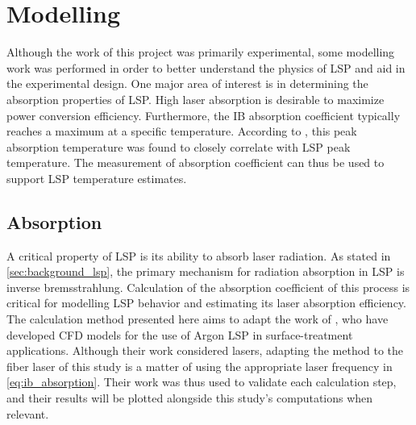 \chapter{Modelling} \label{chp:models}
    Although the work of this project was primarily experimental, some modelling work was performed in order to better understand the physics of LSP and aid in the experimental design. One major area of interest is in determining the absorption properties of LSP. High laser absorption is desirable to maximize power conversion efficiency. Furthermore, the IB absorption coefficient typically reaches a maximum at a specific temperature. According to \textcite{keeferLaserSustainedPlasmas1989}, this peak absorption temperature was found to closely correlate with LSP peak temperature. The measurement of absorption coefficient can thus be used to support LSP temperature estimates.

    \section{Absorption} \label{sec:models_absorption}
        A critical property of LSP is its ability to absorb laser radiation. As stated in \autoref{sec:background_lsp}, the primary mechanism for radiation absorption in LSP is inverse bremsstrahlung. Calculation of the absorption coefficient of this process is critical for modelling LSP behavior and estimating its laser absorption efficiency. The calculation method presented here aims to adapt the work of \textcite{akarapuNumericalModelLasersustained2009,nassarInvestigationLasersustainedPlasma2012}, who have developed CFD models for the use of Argon LSP in surface-treatment applications. Although their work considered  lasers, adapting the method to the fiber laser of this study is a matter of using the appropriate laser frequency in \autoref{eq:ib_absorption}. Their work was thus used to validate each calculation step, and their results will be plotted alongside this study's computations when relevant.
        
